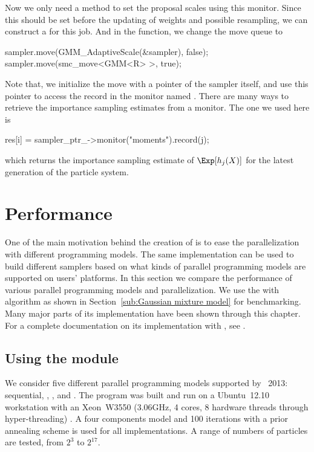 Now we only need a method to set the proposal scales using this monitor. Since this should be set before the updating of weights and possible resampling, we can construct a  for this job.
And in the  function, we change the move queue to
\begin{cppcode}
sampler.move(GMM_AdaptiveScale(&sampler), false);
sampler.move(smc_move<GMM<R> >, true);
\end{cppcode}
Note that, we initialize the move with a pointer of the sampler itself, and use this pointer to access the record in the monitor named . There are many ways to retrieve the importance sampling estimates from a monitor. The one we used here is
\begin{cppcode}
res[i] = sampler_ptr_->monitor("moments").record(j);
\end{cppcode}
which returns the importance sampling estimate of $\Exp[h_j(X)]$ for the latest generation of the particle system.

\section{Performance}
\label{sec:vSMC Performance}

One of the main motivation behind the creation of \vsmc is to ease the parallelization with different programming models. The same implementation can be used to build different samplers based on what kinds of parallel programming models are supported on users' platforms. In this section we compare the performance of various \smp parallel programming models and \opencl parallelization. We use the \gmm with \smc[2] algorithm as shown in Section~\ref{sub:Gaussian mixture model} for benchmarking. Many major parts of its implementation have been shown through this chapter. For a complete documentation on its implementation with \vsmc, see \cite{vsmcjss}.

\subsection{Using the \protect\smp module}
\label{sub:Using the SMP module}

We consider five different parallel programming models supported by \icpc~2013: sequential, \tbb, \cilk, \openmp and \cppoo{} . The program was built and run on a Ubuntu~12.10 workstation with an Xeon~W3550 (3.06GHz, 4 cores, 8 hardware threads through hyper-threading) \cpu. A four components model and 100 iterations with a prior annealing scheme is used for all implementations. A range of numbers of particles are tested, from $2^3$ to $2^{17}$.

